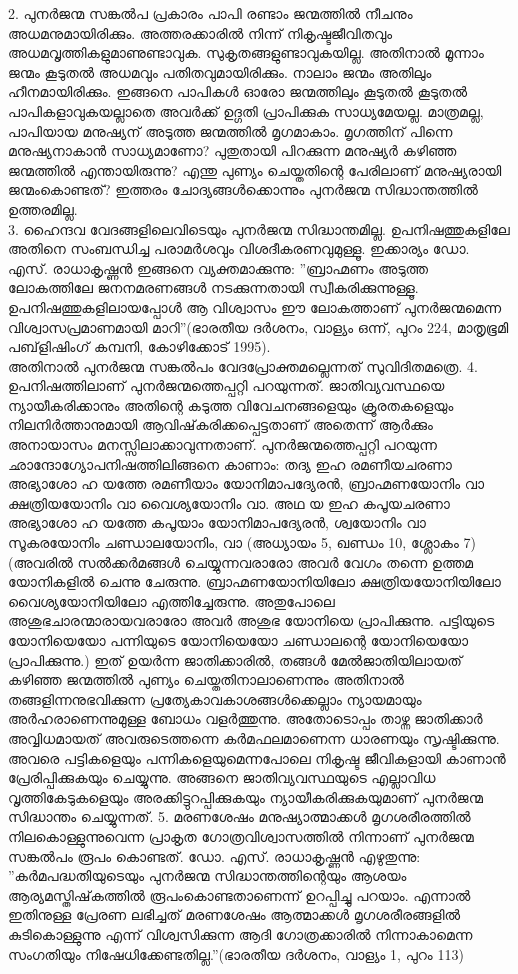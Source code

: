 2. പുനര്‍ജന്മ സങ്കല്‍പ പ്രകാരം പാപി രണ്ടാം ജന്മത്തില്‍ നീചനും അധമനുമായിരിക്കും. അത്തരക്കാരില്‍ നിന്ന് നികൃഷ്ടജീവിതവും അധമവൃത്തികളുമാണുണ്ടാവുക. സുകൃതങ്ങളുണ്ടാവുകയില്ല. അതിനാല്‍ മൂന്നാം ജന്മം കൂടുതല്‍ അധമവും പതിതവുമായിരിക്കും. നാലാം ജന്മം അതിലും ഹീനമായിരിക്കും. ഇങ്ങനെ പാപികള്‍ ഓരോ ജന്മത്തിലും കൂടുതല്‍ കൂടുതല്‍ പാപികളാവുകയല്ലാതെ അവര്‍ക്ക് ഉദ്ഗതി പ്രാപിക്കുക സാധ്യമേയല്ല. മാത്രമല്ല, പാപിയായ മനുഷ്യന് അടുത്ത ജന്മത്തില്‍ മൃഗമാകാം. മൃഗത്തിന് പിന്നെ മനുഷ്യനാകാന്‍ സാധ്യമാണോ? പുതുതായി പിറക്കുന്ന മനുഷ്യര്‍ കഴിഞ്ഞ ജന്മത്തില്‍ എന്തായിരുന്നു? എന്തു പുണ്യം ചെയ്തതിന്റെ പേരിലാണ് മനുഷ്യരായി ജന്മംകൊണ്ടത്? ഇത്തരം ചോദ്യങ്ങള്‍ക്കൊന്നും പുനര്‍ജന്മ സിദ്ധാന്തത്തില്‍ ഉത്തരമില്ല.\\
3. ഹൈന്ദവ വേദങ്ങളിലെവിടെയും പുനര്‍ജന്മ സിദ്ധാന്തമില്ല. ഉപനിഷത്തുകളിലേ അതിനെ സംബന്ധിച്ച പരാമര്‍ശവും വിശദീകരണവുമുള്ളൂ. ഇക്കാര്യം ഡോ. എസ്. രാധാകൃഷ്ണന്‍ ഇങ്ങനെ വ്യക്തമാക്കുന്നു: ''ബ്രാഹ്മണം അടുത്ത ലോകത്തിലേ ജനനമരണങ്ങള്‍ നടക്കുന്നതായി സ്വീകരിക്കുന്നുള്ളൂ. ഉപനിഷത്തുകളിലായപ്പോള്‍ ആ വിശ്വാസം ഈ ലോകത്താണ് പുനര്‍ജന്മമെന്ന വിശ്വാസപ്രമാണമായി മാറി''(ഭാരതീയ ദര്‍ശനം, വാള്യം ഒന്ന്, പുറം 224, മാതൃഭൂമി പബ്‌ളിഷിംഗ് കമ്പനി, കോഴിക്കോട് 1995).\\
അതിനാല്‍ പുനര്‍ജന്മ സങ്കല്‍പം വേദപ്രോക്തമല്ലെന്നത് സുവിദിതമത്രെ.
4. ഉപനിഷത്തിലാണ് പുനര്‍ജന്മത്തെപ്പറ്റി പറയുന്നത്. ജാതിവ്യവസ്ഥയെ ന്യായീകരിക്കാനും അതിന്റെ കടുത്ത വിവേചനങ്ങളെയും ക്രൂരതകളെയും നിലനിര്‍ത്താനുമായി ആവിഷ്‌കരിക്കപ്പെട്ടതാണ് അതെന്ന് ആര്‍ക്കും അനായാസം മനസ്സിലാക്കാവുന്നതാണ്.
പുനര്‍ജന്മത്തെപ്പറ്റി പറയുന്ന ഛാന്ദോഗ്യോപനിഷത്തിലിങ്ങനെ കാണാം:
തദ്യ ഇഹ രമണീയചരണാ അഭ്യാശോ ഹ യത്തേ രമണീയാം യോനിമാപദ്യേരന്‍, ബ്രാഹ്മണയോനിം വാ ക്ഷത്രിയയോനിം വാ വൈശ്യയോനിം വാ. അഥ യ ഇഹ കപൂയചരണാ അഭ്യാശോ ഹ യത്തേ കപൂയാം യോനിമാപദ്യേരന്‍, ശ്വയോനിം വാ സൂകരയോനിം ചണ്ഡാലയോനിം, വാ
(അധ്യായം 5, ഖണ്ഡം 10, ശ്ലോകം 7)
(അവരില്‍ സല്‍ക്കര്‍മങ്ങള്‍ ചെയ്യുന്നവരാരോ അവര്‍ വേഗം തന്നെ ഉത്തമ യോനികളില്‍ ചെന്നു ചേരുന്നു. ബ്രാഹ്മണയോനിയിലോ ക്ഷത്രിയയോനിയിലോ വൈശ്യയോനിയിലോ എത്തിച്ചേരുന്നു. അതുപോലെ അശുഭചാരന്മാരായവരാരോ അവര്‍ അശുഭ യോനിയെ പ്രാപിക്കുന്നു. പട്ടിയുടെ യോനിയെയോ പന്നിയുടെ യോനിയെയോ ചണ്ഡാലന്റെ യോനിയെയോ പ്രാപിക്കുന്നു.)
ഇത് ഉയര്‍ന്ന ജാതിക്കാരില്‍, തങ്ങള്‍ മേല്‍ജാതിയിലായത് കഴിഞ്ഞ ജന്മത്തില്‍ പുണ്യം ചെയ്തതിനാലാണെന്നും അതിനാല്‍ തങ്ങളിന്നനുഭവിക്കുന്ന പ്രത്യേകാവകാശങ്ങള്‍ക്കെല്ലാം ന്യായമായും അര്‍ഹരാണെന്നുമുള്ള ബോധം വളര്‍ത്തുന്നു. അതോടൊപ്പം താഴ്ന്ന ജാതിക്കാര്‍ അവ്വിധമായത് അവരുടെത്തന്നെ കര്‍മഫലമാണെന്ന ധാരണയും സൃഷ്ടിക്കുന്നു. അവരെ പട്ടികളെയും പന്നികളെയുമെന്നപോലെ നികൃഷ്ട ജീവികളായി കാണാന്‍ പ്രേരിപ്പിക്കുകയും ചെയ്യുന്നു. അങ്ങനെ ജാതിവ്യവസ്ഥയുടെ എല്ലാവിധ വൃത്തികേടുകളെയും അരക്കിട്ടുറപ്പിക്കുകയും ന്യായീകരിക്കുകയുമാണ് പുനര്‍ജന്മ സിദ്ധാന്തം ചെയ്യുന്നത്.
5. മരണശേഷം മനുഷ്യാത്മാക്കള്‍ മൃഗശരീരത്തില്‍ നിലകൊള്ളുന്നുവെന്ന പ്രാകൃത ഗോത്രവിശ്വാസത്തില്‍ നിന്നാണ് പുനര്‍ജന്മ സങ്കല്‍പം രൂപം കൊണ്ടത്. ഡോ. എസ്. രാധാകൃഷ്ണന്‍ എഴുതുന്നു: ''കര്‍മപദ്ധതിയുടെയും പുനര്‍ജന്മ സിദ്ധാന്തത്തിന്റെയും ആശയം ആര്യമസ്തിഷ്‌കത്തില്‍ രൂപംകൊണ്ടതാണെന്ന് ഉറപ്പിച്ചു പറയാം. എന്നാല്‍ ഇതിനുള്ള പ്രേരണ ലഭിച്ചത് മരണശേഷം ആത്മാക്കള്‍ മൃഗശരീരങ്ങളില്‍ കുടികൊള്ളുന്നു എന്ന് വിശ്വസിക്കുന്ന ആദി ഗോത്രക്കാരില്‍ നിന്നാകാമെന്ന സംഗതിയും നിഷേധിക്കേണ്ടതില്ല.''(ഭാരതീയ ദര്‍ശനം, വാള്യം 1, പുറം 113)
